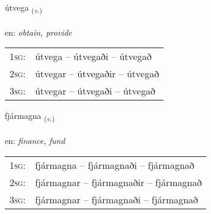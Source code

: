 \documentclass[frontgrid, backgrid]{flacards}\usepackage[]{graphicx}\usepackage[]{xcolor}
\begin{document}
\renewcommand{\flhead}{\vskip5pt \fboxsep=0pt {\small\bfseries\footnotesize Sagnorð | Verb}}
\renewcommand{\fcfoot}{\vskip5pt \fboxsep=0pt \hspace{2pt}{\small\bfseries\footnotesize 3K}}

\renewcommand{\blhead}{\vskip5pt {\small\bfseries\footnotesize Sagnorð | Verb }}
\renewcommand{\bcfoot}{\vskip5pt \hspace{2pt}{\small\bfseries\footnotesize 3K}}


{útvega \small{\textsubscript{(\textit{v.})}} \\[1ex] %
\textphonetic{[uːtvɛɣa]} \\
en: \emph{obtain, provide} \\  [2ex]
\renewcommand*{\arraystretch}{0.8}
\begin{tabular}{p{1cm}l}
\textsc{1sg}: & útvega -- útvegaði -- útvegað \\ 
\textsc{2sg}: & útvegar -- útvegaðir -- útvegað \\ 
\textsc{3sg}: & útvegar -- útvegaði -- útvegað \\ 
\end{tabular}
}

\renewcommand{\flhead}{\vskip5pt \fboxsep=0pt {\small\bfseries\footnotesize Sagnorð | Verb}}
\renewcommand{\fcfoot}{\vskip5pt \fboxsep=0pt \hspace{2pt}{\small\bfseries\footnotesize 3K}}

\renewcommand{\blhead}{\vskip5pt {\small\bfseries\footnotesize Sagnorð | Verb }}
\renewcommand{\bcfoot}{\vskip5pt \hspace{2pt}{\small\bfseries\footnotesize 3K}}


{fjármagna \small{\textsubscript{(\textit{v.})}} \\[1ex] %
\textphonetic{[fjaurmakna]} \\
en: \emph{finance, fund} \\  [2ex]
\renewcommand*{\arraystretch}{0.8}
\begin{tabular}{p{1cm}l}
\textsc{1sg}: & fjármagna -- fjármagnaði -- fjármagnað \\ 
\textsc{2sg}: & fjármagnar -- fjármagnaðir -- fjármagnað \\ 
\textsc{3sg}: & fjármagnar -- fjármagnaði -- fjármagnað \\ 
\end{tabular}
}
\end{document}
